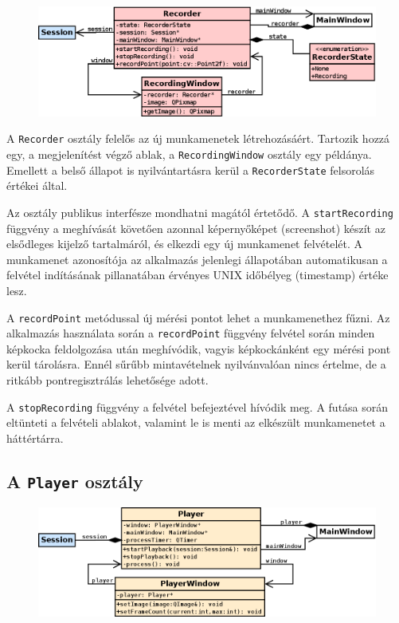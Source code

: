 \begin{figure}[!ht]
\centering
\includegraphics[width=140mm, keepaspectratio]{figures/class_recorder.png}
\end{figure}

A \texttt{Recorder} osztály felelős az új munkamenetek létrehozásáért. Tartozik hozzá egy, a megjelenítést végző ablak, a \texttt{RecordingWindow} osztály egy példánya. Emellett a belső állapot is nyilvántartásra kerül a \texttt{RecorderState} felsorolás értékei által.

Az osztály publikus interfésze mondhatni magától értetődő. A \texttt{startRecording} függvény a meghívását követően azonnal képernyőképet (screenshot) készít az elsődleges kijelző tartalmáról, és elkezdi egy új munkamenet felvételét. A munkamenet azonosítója az alkalmazás jelenlegi állapotában automatikusan a felvétel indításának pillanatában érvényes UNIX időbélyeg (timestamp) értéke lesz.

A \texttt{recordPoint} metódussal új mérési pontot lehet a munkamenethez fűzni. Az alkalmazás használata során a \texttt{recordPoint} függvény felvétel során minden képkocka feldolgozása után meghívódik, vagyis képkockánként egy mérési pont kerül tárolásra. Ennél sűrűbb mintavételnek nyilvánvalóan nincs értelme, de a ritkább pontregisztrálás lehetősége adott.

A \texttt{stopRecording} függvény a felvétel befejeztével hívódik meg. A futása során eltünteti a felvételi ablakot, valamint le is menti az elkészült munkamenetet a háttértárra.

\subsection{A \texttt{Player} osztály}\label{sect:player}

\begin{figure}[!ht]
\centering
\includegraphics[width=140mm, keepaspectratio]{figures/class_player.png}
\end{figure}

